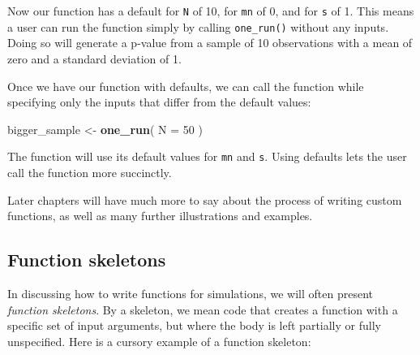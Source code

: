 \documentclass[
]{book}
\newenvironment{Shaded}{\begin{snugshade}}{\end{snugshade}}
\newcommand{\AttributeTok}[1]{\textcolor[rgb]{0.13,0.29,0.53}{#1}}
\newcommand{\ControlFlowTok}[1]{\textcolor[rgb]{0.13,0.29,0.53}{\textbf{#1}}}
\newcommand{\DecValTok}[1]{\textcolor[rgb]{0.00,0.00,0.81}{#1}}
\newcommand{\FunctionTok}[1]{\textcolor[rgb]{0.13,0.29,0.53}{\textbf{#1}}}
\newcommand{\NormalTok}[1]{#1}
\newcommand{\OtherTok}[1]{\textcolor[rgb]{0.56,0.35,0.01}{#1}}
\newcommand{\SpecialCharTok}[1]{\textcolor[rgb]{0.81,0.36,0.00}{\textbf{#1}}}
\begin{document}
\begin{Shaded}
\end{Shaded}

Now our function has a default for \texttt{N} of 10, for \texttt{mn} of 0, and for \texttt{s} of 1.
This means a user can run the function simply by calling \texttt{one\_run()} without any inputs. Doing so will generate a p-value from a sample of 10 observations with a mean of zero and a standard deviation of 1.

Once we have our function with defaults, we can call the function while specifying only the inputs that differ from the default values:

\begin{Shaded}
\begin{Highlighting}[]
\NormalTok{bigger\_sample }\OtherTok{\textless{}{-}} \FunctionTok{one\_run}\NormalTok{( }\AttributeTok{N =} \DecValTok{50}\NormalTok{ )}
\end{Highlighting}
\end{Shaded}

The function will use its default values for \texttt{mn} and \texttt{s}.
Using defaults lets the user call the function more succinctly.

Later chapters will have much more to say about the process of writing custom functions, as well as many further illustrations and examples.

\subsection{Function skeletons}\label{function-skeletons}

In discussing how to write functions for simulations, we will often present \emph{function skeletons}. By a skeleton, we mean code that creates a function with a specific set of input arguments, but where the body is left partially or fully unspecified.
Here is a cursory example of a function skeleton:
\end{document}
